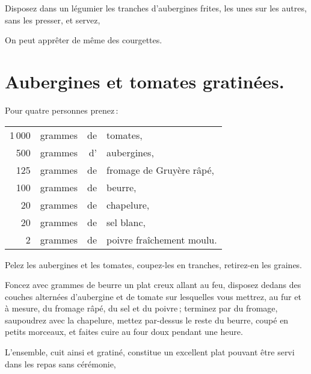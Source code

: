 Disposez dans un légumier les tranches d'aubergines frites, les unes sur les
autres, sans les presser, et servez,

\sk

On peut apprêter de même des courgettes.

\section*{\centering Aubergines et tomates gratinées.}
{}

Pour quatre personnes prenez :

\footnotesize
\begin{longtable}{rrrp{16em}}
  1 000 & grammes & de & tomates,                                                                         \\
    500 & grammes & d' & aubergines,                                                                      \\
    125 & grammes & de & fromage de Gruyère râpé,                                                         \\
    100 & grammes & de & beurre,                                                                          \\
     20 & grammes & de & chapelure,                                                                       \\
     20 & grammes & de & sel blanc,                                                                       \\
      2 & grammes & de & poivre fraîchement moulu.                                                        \\
\end{longtable}
\normalsize

Pelez les aubergines et les tomates, coupez-les en tranches, retirez-en les graines.

Foncez avec {\mmm} grammes de beurre un plat creux allant au feu,
disposez dedans des couches alternées d'aubergine et de tomate sur lesquelles
vous mettrez, au fur et à mesure, du fromage râpé, du sel et du poivre ;
terminez par du fromage, saupoudrez avec la chapelure, mettez par-dessus le
reste du beurre, coupé en petits morceaux, et faites cuire au four doux pendant
une heure.

L'ensemble, cuit ainsi et gratiné, constitue un excellent plat pouvant être
servi dans les repas sans cérémonie,

